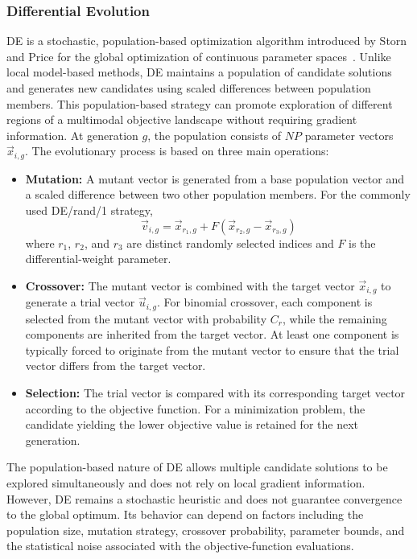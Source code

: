 \subsubsection{Differential Evolution}
DE is a stochastic, population-based optimization algorithm introduced by Storn and Price for the global optimization of continuous parameter spaces~\cite{DE,DE_2}. Unlike local model-based methods, DE maintains a population of candidate solutions and generates new candidates using scaled differences between population members. This population-based strategy can promote exploration of different regions of a multimodal objective landscape without requiring gradient information.
At generation $g$, the population consists of $NP$ parameter vectors $\vec{x}_{i,g}$. The evolutionary process is based on three main operations:
\begin{itemize}
\item \textbf{Mutation:} A mutant vector is generated from a base population vector and a scaled difference between two other population members. For the commonly used DE/rand/1 strategy,
\begin{equation}
\vec{v}_{i,g} = \vec{x}_{r_1,g} + F\left(\vec{x}_{r_2,g} - \vec{x}_{r_3,g}\right)
\end{equation}
where $r_1$, $r_2$, and $r_3$ are distinct randomly selected indices and $F$ is the differential-weight parameter.
\item \textbf{Crossover:} The mutant vector is combined with the target vector $\vec{x}_{i,g}$ to generate a trial vector $\vec{u}_{i,g}$. For binomial crossover, each component is selected from the mutant vector with probability $C_r$, while the remaining components are inherited from the target vector. At least one component is typically forced to originate from the mutant vector to ensure that the trial vector differs from the target vector.
\item \textbf{Selection:} The trial vector is compared with its corresponding target vector according to the objective function. For a minimization problem, the candidate yielding the lower objective value is retained for the next generation.
\end{itemize}
The population-based nature of DE allows multiple candidate solutions to be explored simultaneously and does not rely on local gradient information. However, DE remains a stochastic heuristic and does not guarantee convergence to the global optimum. Its behavior can depend on factors including the population size, mutation strategy, crossover probability, parameter bounds, and the statistical noise associated with the objective-function evaluations.










